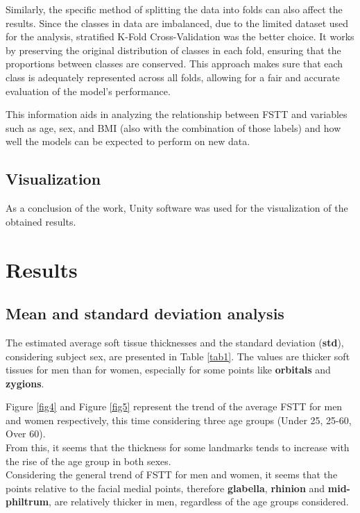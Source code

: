 \documentclass[journal,article,submit,pdftex,moreauthors]{Definitions/mdpi}
\begin{document}
Similarly, the specific method of splitting the data into folds can also affect the results. Since the classes in data are imbalanced, due to the limited dataset used for the analysis, stratified K-Fold Cross-Validation was the better choice. It works by preserving the original distribution of classes in each fold, ensuring that the proportions between classes are conserved. This approach makes sure that each class is adequately represented across all folds, allowing for a fair and accurate evaluation of the model’s performance.

This information aids in analyzing the relationship between FSTT and variables such as age, sex, and BMI (also with the combination of those labels) and how well the models can be expected to perform on new data.

\subsection{Visualization}

As a conclusion of the work, Unity software was used for the visualization of the obtained results.

\section{Results}
\label{sec:res}


\subsection*{Mean and standard deviation analysis}
The estimated average soft tissue thicknesses and the standard deviation (\textbf{std}), considering subject sex, are presented in Table \ref{tab1}. The values are thicker soft tissues for men than for women, especially for some points like \textbf{orbitals} and \textbf{zygions}.


Figure \ref{fig4} and Figure \ref{fig5} represent the trend of the average FSTT for men and women respectively, this time considering three age groups (Under 25, 25-60, Over 60). \\ From this, it seems that the thickness for some landmarks tends to increase with the rise of the age group in both sexes.\\
Considering the general trend of FSTT for men and women, it seems that the points relative to the facial medial points, therefore \textbf{glabella}, \textbf{rhinion} and \textbf{mid-philtrum}, are relatively thicker in men, regardless of the age groups considered.
\end{document}
